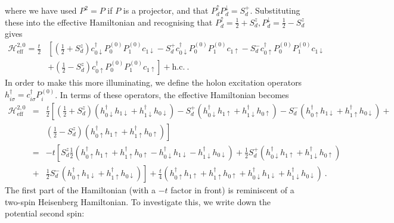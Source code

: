 where we have used \(P^2 = P\) if \(P\) is a projector, and that \(P_d^\uparrow P_d^ \downarrow = S_d^+\). Substituting these into the effective Hamiltonian and recognising that \(P_d^\uparrow = \frac{1}{2} + S_d^z, P_d^\downarrow = \frac{1}{2} - S_d^z\) gives
\begin{eqnarray}
	\mathcal{H}^{2, 0}_\text{eff} = \frac{t}{2}&\left[\left(\frac{1}{2} + S_d^z\right) c^\dagger_{0 \downarrow} P_0^{(0)} P_1^{(0)} c_{1 \downarrow} -S_d^+ c^\dagger_{0 \downarrow} P_0^{(0)} P_1^{(0)} c_{1 \uparrow} - S_d^- c^\dagger_{0 \uparrow} P_0^{(0)} P_1^{(0)} c_{1 \downarrow} \right. \nonumber\\
						   &\left.+ \left(\frac{1}{2} - S_d^z\right) c^\dagger_{0 \uparrow} P_0^{(0)} P_1^{(0)} c_{1 \uparrow} \right] + \text{h.c.}~.
\end{eqnarray}
In order to make this more illuminating, we define the holon excitation operators \(h^\dagger_{i\sigma} = c^\dagger_{i\sigma}P_i^{(0)}\). In terms of these operators, the effective Hamiltonian becomes
\begin{eqnarray}
	\mathcal{H}^{2, 0}_\text{eff} &=& \frac{t}{2}\left[\left(\frac{1}{2} + S_d^z\right) \left(h^\dagger_{0 \downarrow} h_{1 \downarrow} + h^\dagger_{1 \downarrow} h_{0 \downarrow}\right) - S_d^+ \left(h^\dagger_{0 \downarrow} h_{1 \uparrow} + h^\dagger_{1 \downarrow} h_{0 \uparrow}\right) - S_d^- \left(h^\dagger_{0 \uparrow} h_{1 \downarrow} + h^\dagger_{1 \uparrow} h_{0 \downarrow}\right) + \right. \nonumber\\
				      & & \left. \left(\frac{1}{2} - S_d^z\right) \left(h^\dagger_{0 \uparrow} h_{1 \uparrow}+ h^\dagger_{1 \uparrow} h_{0 \uparrow}\right) \right]\nonumber\\
				      &=& -t\left[S_d^z\frac{1}{2}\left(h^\dagger_{0 \uparrow} h_{1 \uparrow}+ h^\dagger_{1 \uparrow} h_{0 \uparrow} - h^\dagger_{0 \downarrow} h_{1 \downarrow} - h^\dagger_{1 \downarrow} h_{0 \downarrow}\right) + \frac{1}{2}S_d^+ \left(h^\dagger_{0 \downarrow} h_{1 \uparrow} + h^\dagger_{1 \downarrow} h_{0 \uparrow}\right) \right. \nonumber\\
				      &+& \left.\frac{1}{2}S_d^- \left(h^\dagger_{0 \uparrow} h_{1 \downarrow} + h^\dagger_{1 \uparrow} h_{0 \downarrow}\right) \right] + \frac{t}{4}\left(h^\dagger_{0 \uparrow} h_{1 \uparrow}+ h^\dagger_{1 \uparrow} h_{0 \uparrow} + h^\dagger_{0 \downarrow} h_{1 \downarrow} + h^\dagger_{1 \downarrow} h_{0 \downarrow}\right) \label{eff-ham-nfl}~.
\end{eqnarray}
The first part of the Hamiltonian (with a \(-t\) factor in front) is reminiscent of a two-spin Heisenberg Hamiltonian. To investigate this, we write down the potential second spin:
